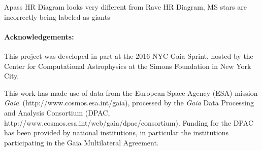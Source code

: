 \documentclass[11pt,letterpaper]{article}
\newcommand{\acronym}[1]{\small{#1}}
\newcommand{\project}[1]{\textsl{#1}}
\newcommand{\Gaia}{\project{Gaia}}
\begin{document}
Apass HR Diagram looks very different from Rave HR Diagram, MS stars are incorrectly being labeled as giants

\paragraph{Acknowledgements:}
This project was developed in part at the 2016 NYC Gaia Sprint, hosted
by the Center for Computational Astrophysics at the Simons Foundation
in New York City.

This work has made use of data from the European Space Agency (ESA)
mission \Gaia\ (http://www.cosmos.esa.int/gaia), processed by the \Gaia
Data Processing and Analysis Consortium (\acronym{DPAC},
http://www.cosmos.esa.int/web/gaia/dpac/consortium). Funding for the
\acronym{DPAC} has been provided by national institutions, in particular the
institutions participating in the Gaia Multilateral Agreement.
\end{document}

